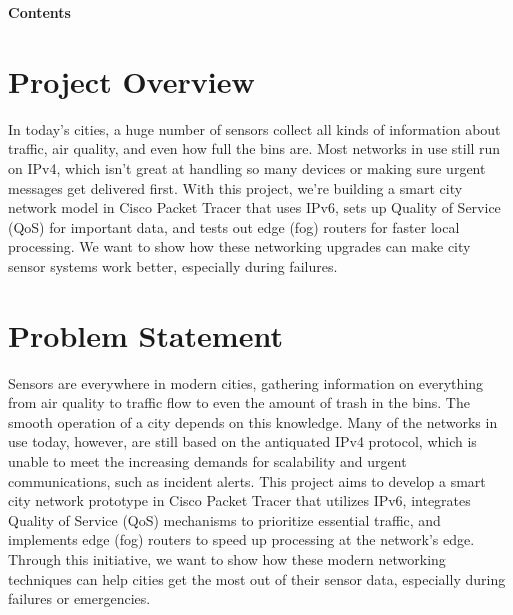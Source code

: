 \documentclass[12pt,a4paper]{article}
\begin{document}
\newpage
\begin{center}
    {\Huge \textbf{Contents}}
\end{center}
\vspace{1.5em}

\tableofcontents
\newpage



\section*{Project Overview}
In today’s cities, a huge number of sensors collect all kinds of information about traffic, air quality, and even how full the bins are. Most networks in use still run on IPv4, which isn’t great at handling so many devices or making sure urgent messages get delivered first. With this project, we’re building a smart city network model in Cisco Packet Tracer that uses IPv6, sets up Quality of Service (QoS) for important data, and tests out edge (fog) routers for faster local processing. We want to show how these networking upgrades can make city sensor systems work better, especially during failures.

\vspace{1em}

\section*{Problem Statement}
Sensors are everywhere in modern cities, gathering information on everything from air quality to traffic flow to even the amount of trash in the bins. The smooth operation of a city depends on this knowledge. Many of the networks in use today, however, are still based on the antiquated IPv4 protocol, which is unable to meet the increasing demands for scalability and urgent communications, such as incident alerts. This project aims to develop a smart city network prototype in Cisco Packet Tracer that utilizes IPv6, integrates Quality of Service (QoS) mechanisms to prioritize essential traffic, and implements edge (fog) routers to speed up processing at the network's edge. Through this initiative, we want to show how these modern networking techniques can help cities get the most out of their sensor data, especially during failures or emergencies.
\end{document}
